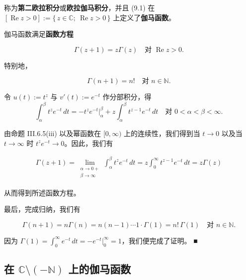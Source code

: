 称为\textbf{第二欧拉积分}或\textbf{欧拉伽马积分}，并且 (9.1) 在 $ [\operatorname{Re} z > 0] := \{\, z \in \mathbb{C} ; \ \operatorname{Re} z > 0 \,\} $ 上定义了\textbf{伽马函数}。

\begin{theorem}

伽马函数满足\textbf{函数方程}

\[
\Gamma(z+1) = z\Gamma(z) \quad \text{对 } \operatorname{Re} z > 0 .
\]

特别地，

\[
\Gamma(n+1) = n! \quad \text{对 } n \in \mathbb{N} .
\]

\proofhead
令 $ u(t) := t^{z} $ 与 $ v'(t) := e^{-t} $ 作分部积分，得
\[
\int_{\alpha}^{\beta} t^{z} e^{-t} \, dt = -t^{z} e^{-t} \big|_{\alpha}^{\beta} + z \int_{\alpha}^{\beta} t^{z-1} e^{-t} \, dt \quad \text{对 } 0 < \alpha < \beta < \infty .
\]

由命题 III.6.5(iii) 以及幂函数在 $ [0, \infty) $ 上的连续性，我们得到当 $ t \to 0 $ 以及当 $ t \to \infty $ 时 $ t^{z} e^{-t} \to 0 $。因此，我们有

\begin{equation*}
\begin{aligned}
\Gamma(z+1) = \lim_{\substack{\alpha \to 0+ \\ \beta \to \infty}} \int_{\alpha}^{\beta} t^{z} e^{-t} \, dt = z \int_{0}^{\infty} t^{z-1} e^{-t} \, dt = z\Gamma(z)
\end{aligned}
\end{equation*}

从而得到所述函数方程。

最后，完成归纳，我们有

\[
\Gamma(n+1) = n\Gamma(n) = n(n-1) \cdots 1 \cdot \Gamma(1) = n! \, \Gamma(1) \quad \text{对 } n \in \mathbb{N} .
\]

因为 $ \Gamma(1) = \int_{0}^{\infty} e^{-t} \, dt = -e^{-t} \big|_{0}^{\infty} = 1 $，我们便完成了证明。 \nobreak\hspace{0.35em}■

\end{theorem}

\subsection*{在 $ \mathbb{C}\setminus(-\mathbb{N}) $ 上的伽马函数}


